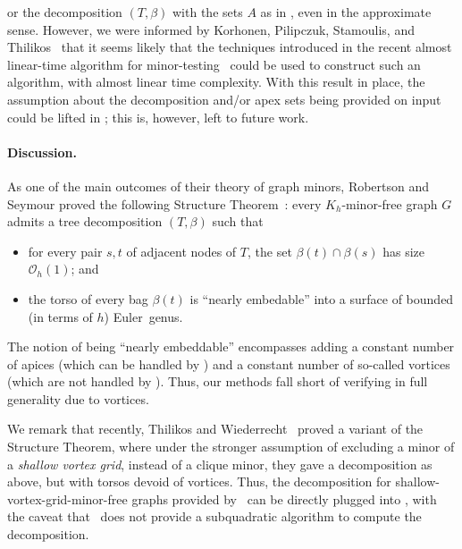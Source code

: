 \documentclass[11pt,a4paper]{article}
\newcommand{\Oh}{\mathcal{O}}
\begin{document}
or the decomposition $(T,\beta)$ with the sets $A$ as in , even in the approximate sense. However, we were informed by Korhonen, Pilipczuk, Stamoulis, and Thilikos~\cite{KorhonenPST24priv} that it seems likely that the techniques introduced in the recent almost linear-time algorithm for minor-testing~\cite{KorhonenPS24} could be used to construct such an algorithm, with almost linear time complexity. With this result in place, the assumption about the decomposition and/or apex sets being provided on input could be lifted in ; this is, however, left to future work.


\paragraph{Discussion.}
As one of the main outcomes of their theory of graph minors, Robertson and Seymour proved the following Structure Theorem~\cite{RobertsonS03a}: every $K_h$-minor-free graph $G$
admits a tree decomposition $(T,\beta)$ such that
\begin{itemize}[nosep]
 \item for every pair $s,t$ of adjacent nodes of $T$, the set $\beta(t) \cap \beta(s)$ has size $\Oh_h(1)$; and
 \item the torso of every bag $\beta(t)$ is ``nearly embedable'' into a surface of bounded (in terms of $h$) Euler~genus.
\end{itemize}
The notion of being ``nearly embeddable'' encompasses adding a constant number of apices (which can be handled by ) and a constant number of so-called
vortices (which are not handled by ). Thus, our methods fall short of verifying   in full generality due to vortices.

We remark that recently, Thilikos and Wiederrecht~\cite{ThilikosW22} proved a variant of the Structure Theorem, where under the stronger assumption of excluding a minor of a {\em{shallow vortex grid}}, instead of a clique minor, they gave a decomposition as above, but with torsos devoid of vortices. Thus, the decomposition for shallow-vortex-grid-minor-free graphs provided by~\cite{ThilikosW22} can be directly plugged into , with the caveat that~\cite{ThilikosW22} does not provide a subquadratic algorithm to compute the decomposition.
\end{document}
